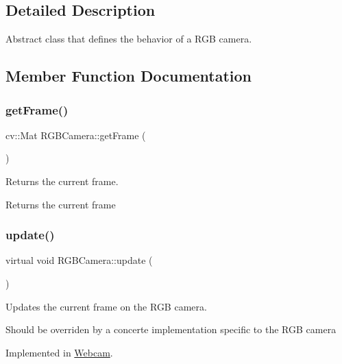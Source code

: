 \subsection{Detailed Description}
Abstract class that defines the behavior of a R\+GB camera. 

\subsection{Member Function Documentation}
\hypertarget{class_r_g_b_camera_a4db0620e9346039530f248fbb7130212}{}\label{class_r_g_b_camera_a4db0620e9346039530f248fbb7130212} 
\subsubsection{\texorpdfstring{get\+Frame()}{getFrame()}}
{\footnotesize\ttfamily cv\+::\+Mat R\+G\+B\+Camera\+::get\+Frame (\begin{DoxyParamCaption}{ }\end{DoxyParamCaption})}



Returns the current frame. 

\begin{DoxyReturn}{Returns}
the current frame 
\end{DoxyReturn}
\hypertarget{class_r_g_b_camera_ac9fa3f8f32605e846827b694ae7cff18}{}\label{class_r_g_b_camera_ac9fa3f8f32605e846827b694ae7cff18} 
\subsubsection{\texorpdfstring{update()}{update()}}
{\footnotesize\ttfamily virtual void R\+G\+B\+Camera\+::update (\begin{DoxyParamCaption}{ }\end{DoxyParamCaption})\hspace{0.3cm}{\ttfamily [pure virtual]}}



Updates the current frame on the R\+GB camera. 

Should be overriden by a concerte implementation specific to the R\+GB camera 

Implemented in \hyperlink{class_webcam_a3d5cab0a2b87b90b85793bc05414e503}{Webcam}.




